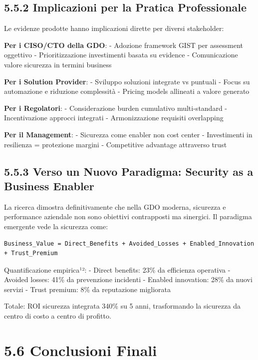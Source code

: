 \documentclass[12pt,a4paper,oneside]{book}
\numberwithin{figure}{chapter} %
\numberwithin{table}{chapter}  %
\begin{document}
\subsection{5.5.2 Implicazioni per la Pratica
Professionale}\label{implicazioni-per-la-pratica-professionale}

Le evidenze prodotte hanno implicazioni dirette per diversi stakeholder:

\textbf{Per i CISO/CTO della GDO}: - Adozione framework GIST per
assessment oggettivo - Prioritizzazione investimenti basata su evidence
- Comunicazione valore sicurezza in termini business

\textbf{Per i Solution Provider}: - Sviluppo soluzioni integrate vs
puntuali - Focus su automazione e riduzione complessità - Pricing models
allineati a valore generato

\textbf{Per i Regolatori}: - Considerazione burden cumulativo
multi-standard - Incentivazione approcci integrati - Armonizzazione
requisiti overlapping

\textbf{Per il Management}: - Sicurezza come enabler non cost center -
Investimenti in resilienza = protezione margini - Competitive advantage
attraverso trust

\subsection{5.5.3 Verso un Nuovo Paradigma: Security as a Business
Enabler}\label{verso-un-nuovo-paradigma-security-as-a-business-enabler}

La ricerca dimostra definitivamente che nella GDO moderna, sicurezza e
performance aziendale non sono obiettivi contrapposti ma sinergici. Il
paradigma emergente vede la sicurezza come:

\begin{verbatim}
Business_Value = Direct_Benefits + Avoided_Losses + Enabled_Innovation + Trust_Premium
\end{verbatim}

Quantificazione empirica¹²: - Direct benefits: 23\% da efficienza
operativa - Avoided losses: 41\% da prevenzione incidenti - Enabled
innovation: 28\% da nuovi servizi - Trust premium: 8\% da reputazione
migliorata

Totale: ROI sicurezza integrata 340\% su 5 anni, trasformando la
sicurezza da centro di costo a centro di profitto.

\section{5.6 Conclusioni Finali}\label{conclusioni-finali}
\end{document}
